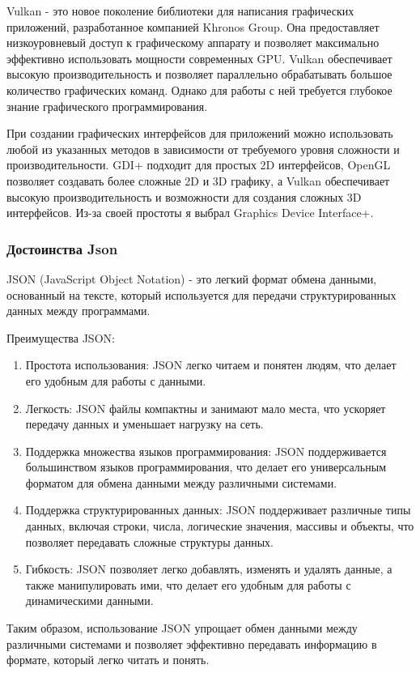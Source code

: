 Vulkan\cite{vulkan} - это новое поколение библиотеки для написания графических приложений, разработанное компанией Khronos Group. Она предоставляет низкоуровневый доступ к графическому аппарату и позволяет максимально эффективно использовать мощности современных GPU. Vulkan обеспечивает высокую производительность и позволяет параллельно обрабатывать большое количество графических команд. Однако для работы с ней требуется глубокое знание графического программирования.

При создании графических интерфейсов для приложений можно использовать любой из указанных методов в зависимости от требуемого уровня сложности и производительности. GDI+ подходит для простых 2D интерфейсов, OpenGL позволяет создавать более сложные 2D и 3D графику, а Vulkan обеспечивает высокую производительность и возможности для создания сложных 3D интерфейсов. Из-за своей простоты я выбрал Graphics Device Interface+.

\subsubsection{Достоинства Json}

JSON (JavaScript Object Notation) - это легкий формат обмена данными, основанный на тексте, который используется для передачи структурированных данных между программами.

Преимущества JSON:
\begin{enumerate}
\item Простота использования: JSON легко читаем и понятен людям, что делает его удобным для работы с данными.
\item Легкость: JSON файлы компактны и занимают мало места, что ускоряет передачу данных и уменьшает нагрузку на сеть.
\item Поддержка множества языков программирования: JSON поддерживается большинством языков программирования, что делает его универсальным форматом для обмена данными между различными системами.
\item Поддержка структурированных данных: JSON поддерживает различные типы данных, включая строки, числа, логические значения, массивы и объекты, что позволяет передавать сложные структуры данных.
\item Гибкость: JSON позволяет легко добавлять, изменять и удалять данные, а также манипулировать ими, что делает его удобным для работы с динамическими данными.
\end{enumerate}
Таким образом, использование JSON упрощает обмен данными между различными системами и позволяет эффективно передавать информацию в формате, который легко читать и понять.

